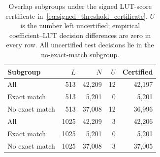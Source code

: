 \begin{table}[t]
\caption{Overlap subgroups under the signed LUT-score certificate in~\eqref{eq:signed_threshold_certificate}. $U$ is the number left uncertified; empirical coefficient--LUT decision differences are zero in every row. All uncertified test decisions lie in the no-exact-match subgroup.}
\label{tab:duplicate-certificates}
\centering\footnotesize\setlength{\tabcolsep}{3pt}
\begin{tabular}{lrrrr}
\toprule
Subgroup & $L$ & $N$ & $U$ & Certified\\
\midrule
All & 513 & 42,209 & 12 & 42,197\\
Exact match & 513 & 5,201 & 0 & 5,201\\
No exact match & 513 & 37,008 & 12 & 36,996\\
All & 1025 & 42,209 & 3 & 42,206\\
Exact match & 1025 & 5,201 & 0 & 5,201\\
No exact match & 1025 & 37,008 & 3 & 37,005\\
\bottomrule
\end{tabular}
\end{table}
